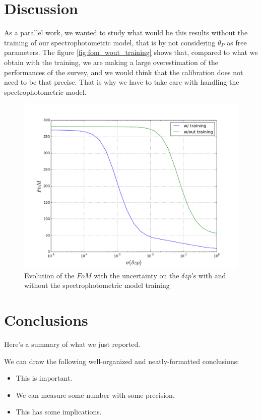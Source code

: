 \documentclass[\docopts]{\docclass}
\begin{document}
\section{Discussion}
\label{sec:discussion}
As a parallel work, we wanted to study what would be this results without the training of our spectrophotometric model, that is by not considering $\theta_P$ as free parameters.
The figure \ref{fig:fom_wout_training} shows that, compared to what we obtain with the training, we are making a large overestimation of the performances of the survey, and we would think that the calibration does not need to be that precise. That is why we have to take care with handling the spectrophotometric model.
\begin{figure}[ht]
  \centering
  \includegraphics[width=0.7\linewidth]{FoM_20k+training.png}
  \caption{Evolution of the $FoM$ with the uncertainty on the $\delta zp$'s with and without the spectrophotometric model training}
  \label{fig:fom_zp}
\end{figure}



\section{Conclusions}
\label{sec:conclusions}

Here's a summary of what we just reported.

We can draw the following well-organized and neatly-formatted conclusions:
\begin{itemize}
  \item This is important.
  \item We can measure some number with some precision.
  \item This has some implications.
\end{itemize}
\end{document}
